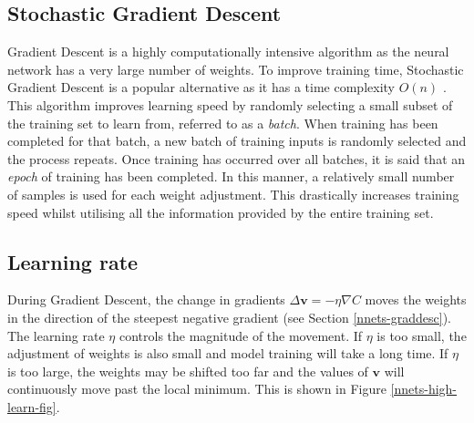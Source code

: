 \subsection*{Stochastic Gradient Descent}\label{nnets-stochgraddesc}

Gradient Descent is a highly computationally intensive algorithm as the neural network has a very large number of weights. To improve training time, Stochastic Gradient Descent is a popular alternative as it has a time complexity $O(n)$ \cite{Robbins1951}. This algorithm improves learning speed by randomly selecting a small subset of the training set to learn from, referred to as a \textit{batch}. When training has been completed for that batch, a new batch of training inputs is randomly selected and the process repeats. Once training has occurred over all batches, it is said that an \textit{epoch} of training has been completed. In this manner, a relatively small number of samples is used for each weight adjustment. This drastically increases training speed whilst utilising all the information provided by the entire training set.

\subsection*{Learning rate}\label{nnets-learningrate}

During Gradient Descent, the change in gradients $\Delta\mathbf{v} = -\eta\nabla C$ moves the weights in the direction of the steepest negative gradient (see Section \ref{nnets-graddesc}). The learning rate $\eta$ controls the magnitude of the movement. If $\eta$ is too small, the adjustment of weights is also small and model training will take a long time. If $\eta$ is too large, the weights may be shifted too far and the values of $\mathbf{v}$ will continuously move past the local minimum. This is shown in Figure \ref{nnets-high-learn-fig}.

